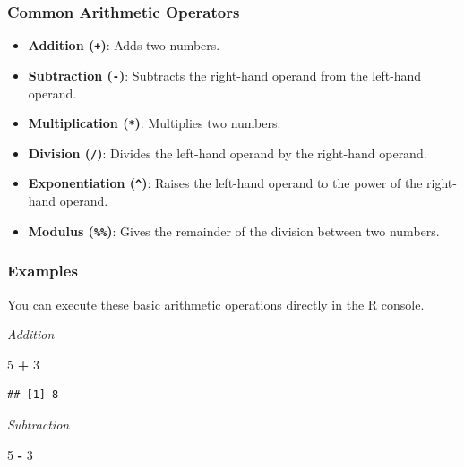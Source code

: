 \documentclass[
  b5paper]{book}
\newenvironment{Shaded}{\begin{snugshade}}{\end{snugshade}}
\newcommand{\DecValTok}[1]{\textcolor[rgb]{0.00,0.00,0.81}{#1}}
\newcommand{\SpecialCharTok}[1]{\textcolor[rgb]{0.81,0.36,0.00}{\textbf{#1}}}
\providecommand{\tightlist}{%
  \setlength{\itemsep}{0pt}\setlength{\parskip}{0pt}}
\begin{document}
\hypertarget{common-arithmetic-operators}{%
\subsubsection*{Common Arithmetic Operators}\label{common-arithmetic-operators}}

\begin{itemize}
\tightlist
\item
  \textbf{Addition (\texttt{+})}: Adds two numbers.
\item
  \textbf{Subtraction (\texttt{-})}: Subtracts the right-hand operand from the left-hand operand.
\item
  \textbf{Multiplication (\texttt{*})}: Multiplies two numbers.
\item
  \textbf{Division (\texttt{/})}: Divides the left-hand operand by the right-hand operand.
\item
  \textbf{Exponentiation (\texttt{\^{}})}: Raises the left-hand operand to the power of the right-hand operand.
\item
  \textbf{Modulus (\texttt{\%\%})}: Gives the remainder of the division between two numbers.
\end{itemize}

\hypertarget{examples}{%
\subsubsection*{Examples}\label{examples}}

You can execute these basic arithmetic operations directly in the R console.

\emph{Addition}

\begin{Shaded}
\begin{Highlighting}[]
\DecValTok{5} \SpecialCharTok{+} \DecValTok{3}
\end{Highlighting}
\end{Shaded}

\begin{verbatim}
## [1] 8
\end{verbatim}

\emph{Subtraction}

\begin{Shaded}
\begin{Highlighting}[]
\DecValTok{5} \SpecialCharTok{{-}} \DecValTok{3}
\end{Highlighting}
\end{Shaded}
\end{document}
